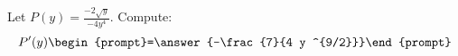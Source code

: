 \documentclass{ximera}
\author{Bart Snapp}
\begin{document}
\begin{exercise}
Let $P(y) = \frac{ -2 \sqrt{y }}{-4 y ^4}$. Compute:
\[
P'(y)
\begin{prompt}=\answer{-\frac{7}{4 y ^{9/2}}}\end{prompt}
\]
\end{exercise}
\end{document}
